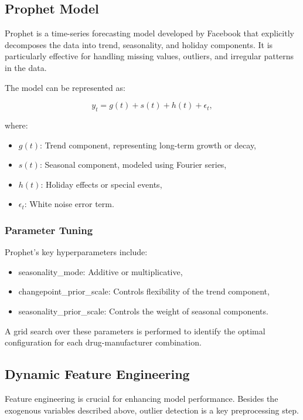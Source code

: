 \documentclass[journal]{IEEEtran}
\begin{document}
\subsection{Prophet Model}
Prophet is a time-series forecasting model developed by Facebook that explicitly decomposes the data into trend, seasonality, and holiday components. It is particularly effective for handling missing values, outliers, and irregular patterns in the data.

The model can be represented as:

\begin{equation}
y_{t}=g(t)+s(t)+h(t)+\epsilon_{t},
\end{equation}

where:
\begin{itemize}
    \item \(g(t)\): Trend component, representing long-term growth or decay,
    \item \(s(t)\): Seasonal component, modeled using Fourier series,
    \item \(h(t)\): Holiday effects or special events,
    \item \(\epsilon_{t}\): White noise error term.
\end{itemize}

\subsubsection{Parameter Tuning}
Prophet's key hyperparameters include:

\begin{itemize}
    \item seasonality\_mode: Additive or multiplicative,
    \item changepoint\_prior\_scale: Controls flexibility of the trend component,
    \item seasonality\_prior\_scale: Controls the weight of seasonal components.
\end{itemize}

A grid search over these parameters is performed to identify the optimal configuration for each drug-manufacturer combination.

\subsection{Dynamic Feature Engineering}
Feature engineering is crucial for enhancing model performance. Besides the exogenous variables described above, outlier detection is a key preprocessing step.
\end{document}
